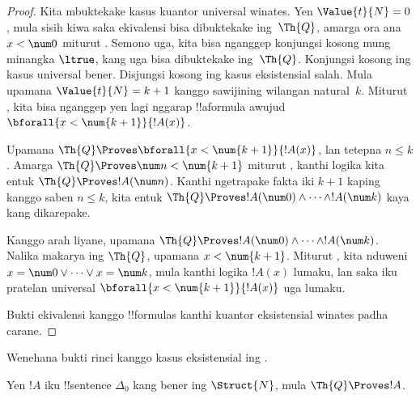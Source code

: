 \documentclass[../../../include/open-logic-section]{subfiles}
\begin{document}
\begin{proof}
    Kita mbuktekake kasus kuantor universal winates.
    Yen $\Value{t}{N} = 0$, mula sisih kiwa saka
    ekivalensi bisa dibuktekake ing~$\Th{Q}$, amarga ora ana
    $x<\num 0$ miturut .
    Semono uga, kita bisa nganggep konjungsi kosong mung minangka
    $\ltrue$, kang uga bisa dibuktekake ing~$\Th{Q}$. Konjungsi kosong ing kasus universal bener. Disjungsi kosong ing kasus eksistensial salah.
    Mula upamana $\Value{t}{N} = k+1$ kanggo sawijining
    wilangan natural~$k$. Miturut , kita
    bisa nganggep yen lagi nggarap !!a{formula} awujud
    $\bforall{x<\num{k+1}}{!A(x)}$.
    
    Upamana $\Th{Q} \Proves \bforall{x<\num{k+1}}{!A(x)}$,
    lan tetepna $n \leq k$. Amarga
    $\Th{Q} \Proves \num n < \num{k+1}$ miturut
    , kanthi logika kita entuk
    $\Th{Q} \Proves !A(\num n)$. Kanthi ngetrapake fakta iki $k+1$
    kaping kanggo saben $n \leq k$, kita entuk
    $\Th{Q} \Proves !A(\num 0) \land \dots \land !A(\num k)$
    kaya kang dikarepake.
    
    Kanggo arah liyane, upamana $\Th{Q} \Proves
    !A(\num 0) \land \dots \land !A(\num k)$. Nalika makarya ing
    $\Th{Q}$, upamana $x < \num{k+1}$.
    Miturut , kita nduweni
    $x = \num 0 \lor \dots \lor x = \num k$, mula kanthi logika
    $!A(x)$ lumaku, lan saka iku pratelan universal
    $\bforall{x<\num{k+1}}{!A(x)}$ uga lumaku.
    
    Bukti ekivalensi kanggo !!{formula}s kanthi kuantor
    eksistensial winates padha carane.
\end{proof}

\begin{prob}
Wenehana bukti rinci kanggo kasus eksistensial ing
.
\end{prob}

\begin{lem}
Yen $!A$ iku !!{sentence} $\Delta_0$ kang bener ing
$\Struct{N}$, mula $\Th{Q} \Proves !A$.
\end{lem}
\end{document}
